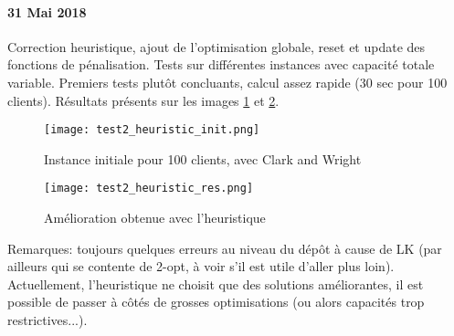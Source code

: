 \documentclass[a4paper,11pt]{article}%
\begin{document}
\paragraph*{31 Mai 2018}

Correction heuristique, ajout de l'optimisation globale, reset et update des fonctions de pénalisation. Tests sur différentes instances avec capacité totale variable. Premiers tests plutôt concluants, calcul assez rapide (30 sec pour 100 clients). Résultats présents sur les images \ref{test2_Heu_init} et \ref{test2_Heu_imp}. 

\begin{figure}[ht]
\centering
\texttt{[image: test2\_heuristic\_init.png]}
	\caption{Instance initiale pour 100 clients, avec Clark and Wright}
	\label{test2_Heu_init}
\end{figure}

\begin{figure}[ht]
\centering
\texttt{[image: test2\_heuristic\_res.png]}
	\caption{Amélioration obtenue avec l'heuristique}
	\label{test2_Heu_imp}
\end{figure}


Remarques: toujours quelques erreurs au niveau du dépôt à cause de LK (par ailleurs qui se contente de 2-opt, à voir s'il est utile d'aller plus loin). Actuellement, l'heuristique ne choisit que des solutions améliorantes, il est possible de passer à côtés de grosses optimisations (ou alors capacités trop restrictives...).  
\end{document}
